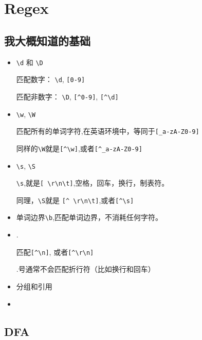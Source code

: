 \chapter{Regex}


\section{我大概知道的基础}

\begin{itemize}
\item \lstinline$\d$ 和 \lstinline$\D$

匹配数字： \lstinline$\d$, \lstinline$[0-9]$

匹配非数字： \lstinline$\D$, \lstinline$[^0-9]$, \lstinline$[^\d]$

\item \lstinline$\w$, \lstinline$\W$

匹配所有的单词字符,在英语环境中，等同于\lstinline$[_a-zA-Z0-9]$

同样的\lstinline$\W$就是\lstinline$[^\w]$,或者\lstinline$[^_a-zA-Z0-9]$

\item \lstinline$\s$, \lstinline$\S$

\lstinline$\s$,就是\lstinline$[ \r\n\t]$,空格，回车，换行，制表符。

同理，\lstinline$\S$就是 \lstinline$[^ \r\n\t]$,或者\lstinline$[^\s]$

\item 单词边界\lstinline$\b$,匹配单词边界，不消耗任何字符。

\item .

匹配\lstinline$[^\n]$, 或者\lstinline$[^\r\n]$

.号通常不会匹配折行符（比如换行和回车）

\item 分组和引用

\item 

\end{itemize}


\section{DFA}



